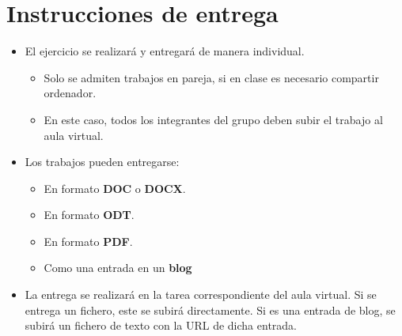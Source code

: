 \section{Instrucciones de entrega}
\begin{itemize}
\item El ejercicio se realizará y entregará de manera individual.
  \begin{itemize}
  \item Solo se admiten trabajos en pareja, si en clase es necesario compartir ordenador.
  \item En este caso, todos los integrantes del grupo deben subir el trabajo al aula virtual.

  \end{itemize}
\item Los trabajos pueden entregarse:
  \begin{itemize}
  \item En formato \textbf{DOC} o \textbf{DOCX}.
  \item En formato \textbf{ODT}.
  \item En formato \textbf{PDF}. 
  \item Como una entrada en un \textbf{blog}

  \end{itemize}
  
\item La entrega se realizará en la tarea correspondiente del aula virtual. Si se entrega un fichero, este se subirá directamente. Si es una entrada de blog, se subirá un fichero de texto con la URL de dicha entrada.
\end{itemize}  


